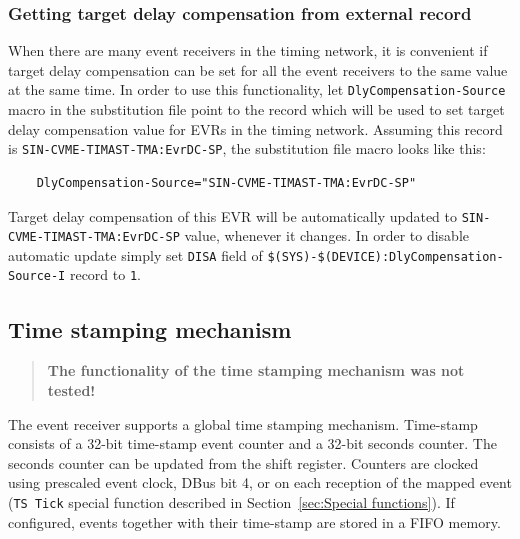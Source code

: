 \documentclass[12pt,a4paper]{article}
\begin{document}
\subsubsection{Getting target delay compensation from external record}
When there are many event receivers in the timing network, it is convenient if target delay compensation can be set for all the event receivers to the same value at the same time. In order to use this functionality, let \texttt{DlyCompensation-Source} macro in the substitution file point to the record which will be used to set target delay compensation value for EVRs in the timing network. Assuming this record is \texttt{SIN-CVME-TIMAST-TMA:EvrDC-SP}, the substitution file macro looks like this:
\begin{verbatim}
	DlyCompensation-Source="SIN-CVME-TIMAST-TMA:EvrDC-SP"
\end{verbatim}
Target delay compensation of this EVR will be automatically updated to \texttt{SIN-CVME-TIMAST-TMA:EvrDC-SP} value, whenever it changes. In order to disable automatic update simply set \texttt{DISA} field of \newline\texttt{\$(SYS)-\$(DEVICE):DlyCompensation-Source-I} record to \texttt{1}.

\subsection{Time stamping mechanism}\label{sec:Time stamping mechanism}
\begin{quote}
\textbf{The functionality of the time stamping mechanism was not tested!}
\end{quote}
The event receiver supports a global time stamping mechanism. Time-stamp consists of a 32-bit time-stamp event counter and a 32-bit seconds counter. The seconds counter can be updated from the
shift register. Counters are clocked using prescaled event clock, DBus bit 4, or on each reception of the mapped event (\texttt{TS Tick} special function described in Section~\ref{sec:Special functions}). If configured, events together with their time-stamp are stored in a FIFO memory.
\end{document}
